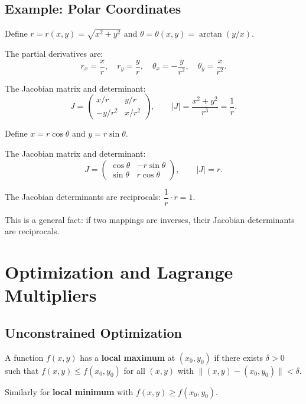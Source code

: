 \documentclass[11pt]{report}
\begin{document}
\subsection*{Example: Polar Coordinates}

\begin{example}
Define $r = r(x, y) = \sqrt{x^2 + y^2}$ and $\theta = \theta(x, y) = \arctan(y/x)$.

The partial derivatives are:
\[
r_x = \frac{x}{r}, \quad r_y = \frac{y}{r}, \quad \theta_x = -\frac{y}{r^2}, \quad \theta_y = \frac{x}{r^2}.
\]

The Jacobian matrix and determinant:
\[
J = \begin{pmatrix} x/r & y/r \\ -y/r^2 & x/r^2 \end{pmatrix}, \qquad |J| = \frac{x^2 + y^2}{r^3} = \frac{1}{r}.
\]
\end{example}

\begin{example}
Define $x = r\cos\theta$ and $y = r\sin\theta$.

The Jacobian matrix and determinant:
\[
J = \begin{pmatrix} \cos\theta & -r\sin\theta \\ \sin\theta & r\cos\theta \end{pmatrix}, \qquad |J| = r.
\]
\end{example}

\begin{remark}
The Jacobian determinants are reciprocals: $\dfrac{1}{r} \cdot r = 1$.

This is a general fact: if two mappings are inverses, their Jacobian determinants are reciprocals.
\end{remark}

\section{Optimization and Lagrange Multipliers}

\subsection{Unconstrained Optimization}

\begin{definition}
A function $f(x, y)$ has a \textbf{local maximum} at $(x_0, y_0)$ if there exists $\delta > 0$ such that $f(x, y) \leq f(x_0, y_0)$ for all $(x, y)$ with $\|(x, y) - (x_0, y_0)\| < \delta$.

Similarly for \textbf{local minimum} with $f(x, y) \geq f(x_0, y_0)$.
\end{definition}
\end{document}

